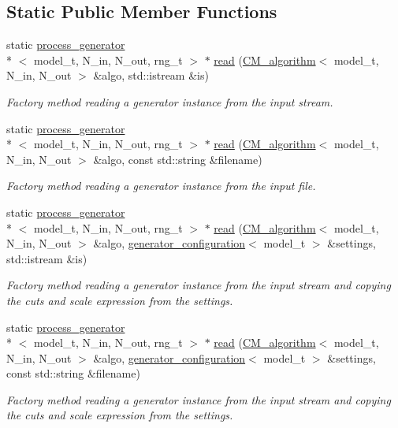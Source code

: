 \subsection*{Static Public Member Functions}
\begin{DoxyCompactItemize}
\item 
static \hyperlink{a00430}{process\-\_\-generator}\\*
$<$ model\-\_\-t, N\-\_\-in, N\-\_\-out, rng\-\_\-t $>$ $\ast$ \hyperlink{a00430_adb199c9f5da855daa254c62dccccfbb6}{read} (\hyperlink{a00070}{C\-M\-\_\-algorithm}$<$ model\-\_\-t, N\-\_\-in, N\-\_\-out $>$ \&algo, std\-::istream \&is)
\begin{DoxyCompactList}\small\item\em Factory method reading a generator instance from the input stream. \end{DoxyCompactList}\item 
static \hyperlink{a00430}{process\-\_\-generator}\\*
$<$ model\-\_\-t, N\-\_\-in, N\-\_\-out, rng\-\_\-t $>$ $\ast$ \hyperlink{a00430_a944201eb8a24b18784bb0a6d1f890378}{read} (\hyperlink{a00070}{C\-M\-\_\-algorithm}$<$ model\-\_\-t, N\-\_\-in, N\-\_\-out $>$ \&algo, const std\-::string \&filename)
\begin{DoxyCompactList}\small\item\em Factory method reading a generator instance from the input file. \end{DoxyCompactList}\item 
static \hyperlink{a00430}{process\-\_\-generator}\\*
$<$ model\-\_\-t, N\-\_\-in, N\-\_\-out, rng\-\_\-t $>$ $\ast$ \hyperlink{a00430_a2503d0f980ec19d002b867fb00c78574}{read} (\hyperlink{a00070}{C\-M\-\_\-algorithm}$<$ model\-\_\-t, N\-\_\-in, N\-\_\-out $>$ \&algo, \hyperlink{a00237}{generator\-\_\-configuration}$<$ model\-\_\-t $>$ \&settings, std\-::istream \&is)
\begin{DoxyCompactList}\small\item\em Factory method reading a generator instance from the input stream and copying the cuts and scale expression from the settings. \end{DoxyCompactList}\item 
static \hyperlink{a00430}{process\-\_\-generator}\\*
$<$ model\-\_\-t, N\-\_\-in, N\-\_\-out, rng\-\_\-t $>$ $\ast$ \hyperlink{a00430_a7bff5e417f5cd39b7d0236d6bbf8286f}{read} (\hyperlink{a00070}{C\-M\-\_\-algorithm}$<$ model\-\_\-t, N\-\_\-in, N\-\_\-out $>$ \&algo, \hyperlink{a00237}{generator\-\_\-configuration}$<$ model\-\_\-t $>$ \&settings, const std\-::string \&filename)
\begin{DoxyCompactList}\small\item\em Factory method reading a generator instance from the input stream and copying the cuts and scale expression from the settings. \end{DoxyCompactList}\end{DoxyCompactItemize}
